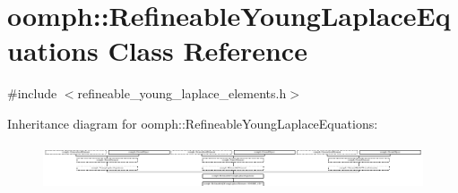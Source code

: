 \hypertarget{classoomph_1_1RefineableYoungLaplaceEquations}{}\section{oomph\+:\+:Refineable\+Young\+Laplace\+Equations Class Reference}
\label{classoomph_1_1RefineableYoungLaplaceEquations}


{\ttfamily \#include $<$refineable\+\_\+young\+\_\+laplace\+\_\+elements.\+h$>$}

Inheritance diagram for oomph\+:\+:Refineable\+Young\+Laplace\+Equations\+:\begin{figure}[H]
\begin{center}
\leavevmode
\includegraphics[height=1.329535cm]{classoomph_1_1RefineableYoungLaplaceEquations}
\end{center}
\end{figure}
